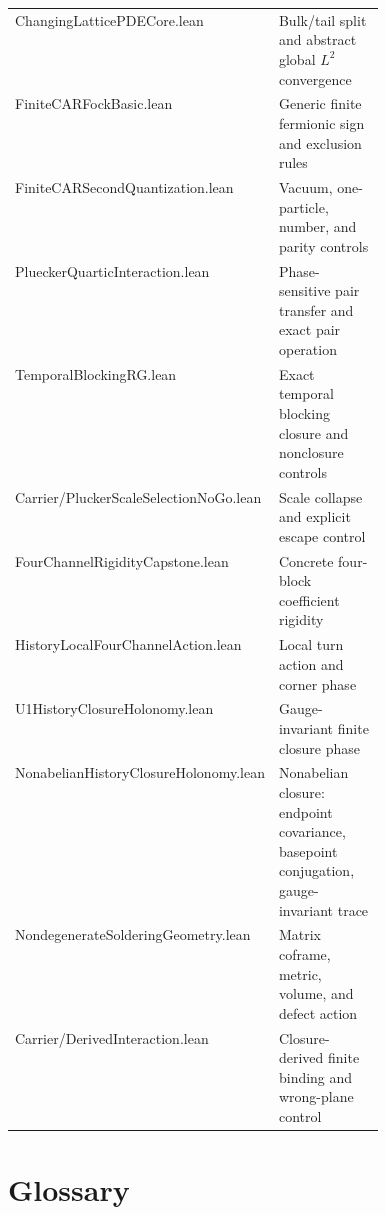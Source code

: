 \documentclass[11pt]{article}
\begin{document}
\begin{center}
\begin{tabularx}{0.97\linewidth}{@{}>{\ttfamily}p{0.43\linewidth}X@{}}
ChangingLatticePDECore.lean & Bulk/tail split and abstract global $L^2$ convergence\\
FiniteCARFockBasic.lean & Generic finite fermionic sign and exclusion rules\\
FiniteCARSecondQuantization.lean & Vacuum, one-particle, number, and parity controls\\
PlueckerQuarticInteraction.lean & Phase-sensitive pair transfer and exact pair operation\\
TemporalBlockingRG.lean & Exact temporal blocking closure and nonclosure controls\\
Carrier/PluckerScaleSelectionNoGo.lean & Scale collapse and explicit escape control\\
FourChannelRigidityCapstone.lean & Concrete four-block coefficient rigidity\\
HistoryLocalFourChannelAction.lean & Local turn action and corner phase\\
U1HistoryClosureHolonomy.lean & Gauge-invariant finite closure phase\\
NonabelianHistoryClosureHolonomy.lean & Nonabelian closure: endpoint
covariance, basepoint conjugation, gauge-invariant trace\\
NondegenerateSolderingGeometry.lean & Matrix coframe, metric, volume, and defect action\\
Carrier/DerivedInteraction.lean & Closure-derived finite binding and wrong-plane control\\
\bottomrule
\end{tabularx}
\end{center}

\section{Glossary}
\end{document}
